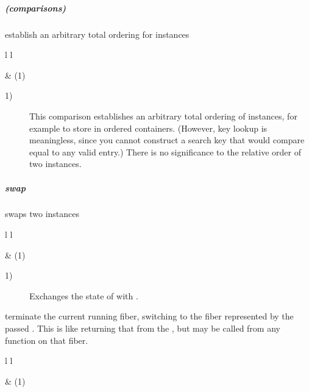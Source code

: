 \subparagraph*{(comparisons)}
establish an arbitrary total ordering for \fiber instances\\

\begin{tabular}{ l l }
    \midrule

     & (1)\\

    \midrule
\end{tabular}

\begin{description}
    \item[1)] This comparison establishes an arbitrary total ordering of \fiber
              instances, for example to store in ordered containers. (However,
              key lookup is meaningless, since you cannot construct a search key
              that would compare equal to any valid entry.) There is no significance
              to the relative order of two instances.
\end{description}


\subparagraph*{swap}
swaps two \fiber instances\\

\begin{tabular}{ l l }
    \midrule

     & (1)\\

    \midrule
\end{tabular}

\begin{description}
    \item[1)] Exchanges the state of  with .\\
\end{description}



terminate the current running fiber, switching to the fiber represented by
the passed \fiber. This is like returning that \fiber from the \entryfn, but may
be called from any function on that fiber.\\

\begin{tabular}{ l l }
    \midrule

     & (1)\\

    \midrule
\end{tabular}

